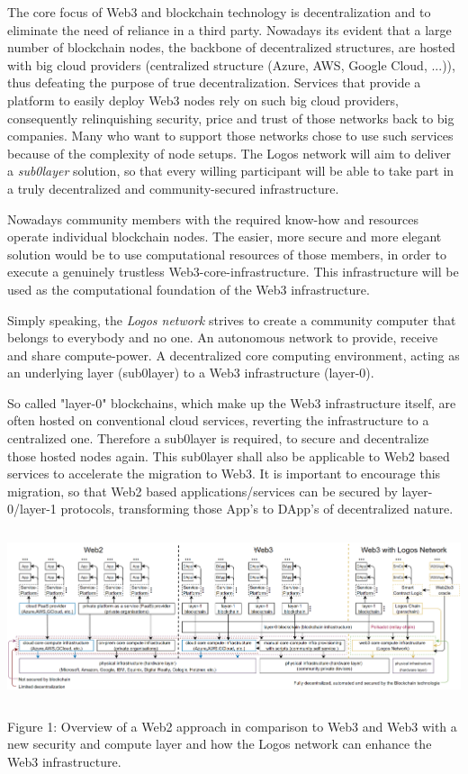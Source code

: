 \documentclass[]{article}
\begin{document}
The core focus of Web3 and blockchain technology is decentralization and to eliminate the need of reliance in a third party.
Nowadays its evident that a large number of blockchain nodes, the backbone of decentralized structures, are hosted with big cloud providers (centralized structure (Azure, AWS, Google Cloud, ...)), thus defeating the purpose of true decentralization.
Services that provide a platform to easily deploy Web3 nodes rely on such big cloud providers, consequently relinquishing security, price and trust of those networks back to big companies.
Many who want to support those networks chose to use such services because of the complexity of node setups. 
The Logos network will aim to deliver a \textit{sub0layer} solution, so that every willing participant will be able to take part in a truly decentralized and community-secured infrastructure.

Nowadays community members with the required know-how and resources operate individual blockchain nodes. 
The easier, more secure and more elegant solution would be to use computational resources of those members, in order to  execute a genuinely trustless Web3-core-infrastructure. 
This infrastructure will be used as the computational foundation of the Web3 infrastructure.

Simply speaking, the \textit{Logos network} strives to create a community computer that belongs to everybody and no one.
An autonomous network to provide, receive and share compute-power.
A decentralized core computing environment, acting as an underlying layer (sub0layer) to a Web3 infrastructure (layer-0).

So called "layer-0" blockchains, which make up the Web3 infrastructure itself, are often hosted on conventional cloud services, reverting the infrastructure to a centralized one. 
Therefore a sub0layer is required, to secure and decentralize those hosted nodes again.  
This sub0layer shall also be applicable to Web2 based services to accelerate the migration to Web3.
It is important to encourage this migration, so that Web2 based applications/services can be secured by layer-0/layer-1 protocols, transforming those App's to DApp's of decentralized nature.

\begin{center}
	\includegraphics[height=5cm]{network-requirement}
\end{center}
\begin{center}
	Figure 1: Overview of a Web2 approach in comparison to Web3 and Web3 with a new security and compute layer and how the Logos network can enhance the Web3 infrastructure.
\end{center}
\end{document}
